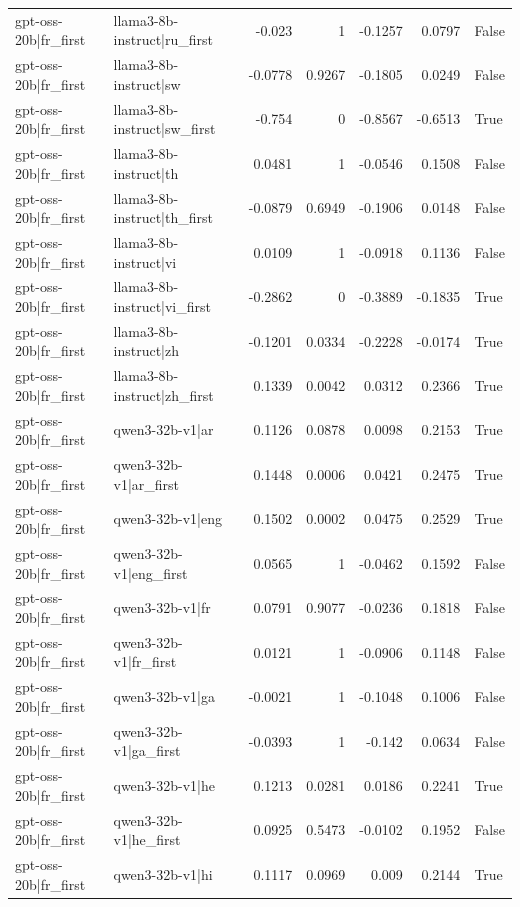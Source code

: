 \begin{table}
\begin{tabular}{l l r r r r l}
gpt-oss-20b|fr_first & llama3-8b-instruct|ru_first & -0.023 & 1 & -0.1257 & 0.0797 & False \\
gpt-oss-20b|fr_first & llama3-8b-instruct|sw & -0.0778 & 0.9267 & -0.1805 & 0.0249 & False \\
gpt-oss-20b|fr_first & llama3-8b-instruct|sw_first & -0.754 & 0 & -0.8567 & -0.6513 & True \\
gpt-oss-20b|fr_first & llama3-8b-instruct|th & 0.0481 & 1 & -0.0546 & 0.1508 & False \\
gpt-oss-20b|fr_first & llama3-8b-instruct|th_first & -0.0879 & 0.6949 & -0.1906 & 0.0148 & False \\
gpt-oss-20b|fr_first & llama3-8b-instruct|vi & 0.0109 & 1 & -0.0918 & 0.1136 & False \\
gpt-oss-20b|fr_first & llama3-8b-instruct|vi_first & -0.2862 & 0 & -0.3889 & -0.1835 & True \\
gpt-oss-20b|fr_first & llama3-8b-instruct|zh & -0.1201 & 0.0334 & -0.2228 & -0.0174 & True \\
gpt-oss-20b|fr_first & llama3-8b-instruct|zh_first & 0.1339 & 0.0042 & 0.0312 & 0.2366 & True \\
gpt-oss-20b|fr_first & qwen3-32b-v1|ar & 0.1126 & 0.0878 & 0.0098 & 0.2153 & True \\
gpt-oss-20b|fr_first & qwen3-32b-v1|ar_first & 0.1448 & 0.0006 & 0.0421 & 0.2475 & True \\
gpt-oss-20b|fr_first & qwen3-32b-v1|eng & 0.1502 & 0.0002 & 0.0475 & 0.2529 & True \\
gpt-oss-20b|fr_first & qwen3-32b-v1|eng_first & 0.0565 & 1 & -0.0462 & 0.1592 & False \\
gpt-oss-20b|fr_first & qwen3-32b-v1|fr & 0.0791 & 0.9077 & -0.0236 & 0.1818 & False \\
gpt-oss-20b|fr_first & qwen3-32b-v1|fr_first & 0.0121 & 1 & -0.0906 & 0.1148 & False \\
gpt-oss-20b|fr_first & qwen3-32b-v1|ga & -0.0021 & 1 & -0.1048 & 0.1006 & False \\
gpt-oss-20b|fr_first & qwen3-32b-v1|ga_first & -0.0393 & 1 & -0.142 & 0.0634 & False \\
gpt-oss-20b|fr_first & qwen3-32b-v1|he & 0.1213 & 0.0281 & 0.0186 & 0.2241 & True \\
gpt-oss-20b|fr_first & qwen3-32b-v1|he_first & 0.0925 & 0.5473 & -0.0102 & 0.1952 & False \\
gpt-oss-20b|fr_first & qwen3-32b-v1|hi & 0.1117 & 0.0969 & 0.009 & 0.2144 & True \\

\end{tabular}
\end{table}
